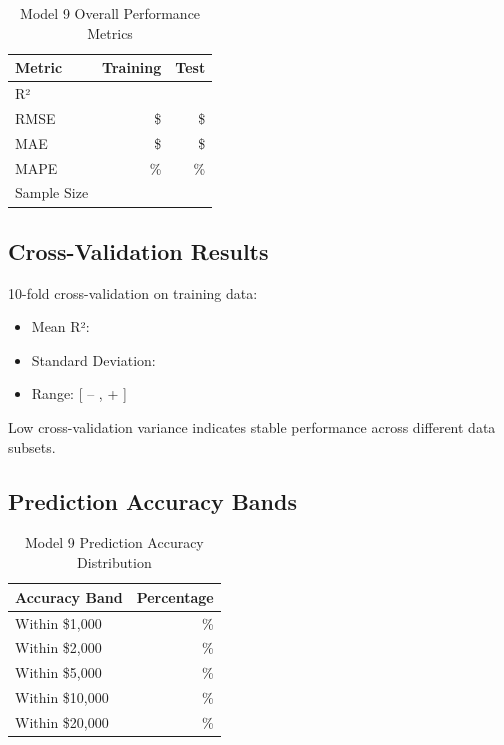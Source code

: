 \begin{table}[h]
\centering
\caption{Model 9 Overall Performance Metrics}
\begin{tabular}{lrr}
\toprule
\textbf{Metric} & \textbf{Training} & \textbf{Test} \\
\midrule
R² & \ModelNineRSquaredTrain{} & \ModelNineRSquaredTest{} \\
RMSE & \$\ModelNineRMSETrain{} & \$\ModelNineRMSETest{} \\
MAE & \$\ModelNineMAETrain{} & \$\ModelNineMAETest{} \\
MAPE & \ModelNineMAPETrain{}\% & \ModelNineMAPETest{}\% \\
Sample Size & \ModelNineTrainingSamples{} & \ModelNineTestSamples{} \\
\bottomrule
\end{tabular}
\label{tab:model9_overall}
\end{table}

\subsection{Cross-Validation Results}

10-fold cross-validation on training data:
\begin{itemize}
    \item Mean R²: \ModelNineCVMean{}
    \item Standard Deviation: \ModelNineCVStd{}
    \item Range: [\ModelNineCVMean{} -- \ModelNineCVStd{}, \ModelNineCVMean{} + \ModelNineCVStd{}]
\end{itemize}

Low cross-validation variance indicates stable performance across different data subsets.

\subsection{Prediction Accuracy Bands}

\begin{table}[h]
\centering
\caption{Model 9 Prediction Accuracy Distribution}
\begin{tabular}{lr}
\toprule
\textbf{Accuracy Band} & \textbf{Percentage} \\
\midrule
Within \$1,000 & \ModelNineWithinOneK{}\% \\
Within \$2,000 & \ModelNineWithinTwoK{}\% \\
Within \$5,000 & \ModelNineWithinFiveK{}\% \\
Within \$10,000 & \ModelNineWithinTenK{}\% \\
Within \$20,000 & \ModelNineWithinTwentyK{}\% \\
\bottomrule
\end{tabular}
\label{tab:model9_accuracy}
\end{table}

